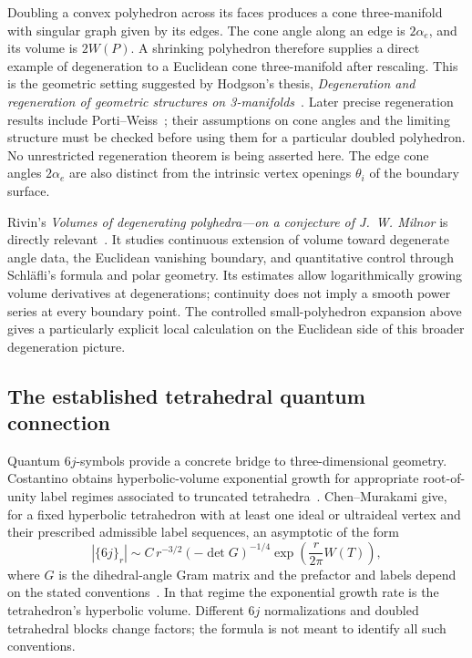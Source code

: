 Doubling a convex polyhedron across its faces produces a cone
three-manifold with singular graph given by its edges. The cone
angle along an edge is $2\alpha_e$, and its volume is $2W(P)$.
A shrinking polyhedron therefore supplies a direct example of
degeneration to a Euclidean cone three-manifold after rescaling.
This is the geometric setting suggested by Hodgson's thesis,
\emph{Degeneration and regeneration of geometric structures on
3-manifolds}~\cite{HodgsonThesis}. Later precise regeneration results
include Porti--Weiss~\cite{PortiWeiss}; their assumptions on cone
angles and the limiting structure must be checked before using
them for a particular doubled polyhedron. No unrestricted
regeneration theorem is being asserted here. The edge cone angles
$2\alpha_e$ are also distinct from the intrinsic vertex openings
$\theta_i$ of the boundary surface.

Rivin's \emph{Volumes of degenerating polyhedra---on a conjecture
of J.~W. Milnor} is directly relevant~\cite{RivinDegeneration}.
It studies continuous extension of volume toward degenerate angle
data, the Euclidean vanishing boundary, and quantitative control
through Schl\"afli's formula and polar geometry. Its estimates
allow logarithmically growing volume derivatives at degenerations;
continuity does not imply a smooth power series at every boundary
point. The controlled small-polyhedron expansion above gives a
particularly explicit local calculation on the Euclidean side of
this broader degeneration picture.

\subsection{The established tetrahedral quantum connection}

Quantum $6j$-symbols provide a concrete bridge to three-dimensional
geometry. Costantino obtains hyperbolic-volume exponential growth
for appropriate root-of-unity label regimes associated to truncated
tetrahedra~\cite{Costantino}. Chen--Murakami give, for a fixed
hyperbolic tetrahedron with at least one ideal or ultraideal vertex
and their prescribed admissible label sequences, an asymptotic of
the form
\begin{equation}
 |\{6j\}_r|\sim C\,r^{-3/2}(-\det G)^{-1/4}
                 \exp\left(\frac{r}{2\pi}W(T)\right),
 \label{eq:quantum6jstructure}
\end{equation}
where $G$ is the dihedral-angle Gram matrix and the prefactor and
labels depend on the stated conventions~\cite{ChenMurakami}.
In that regime the exponential growth rate is the tetrahedron's
hyperbolic volume. Different $6j$ normalizations and doubled
tetrahedral blocks change factors; the formula is not meant to
identify all such conventions.

